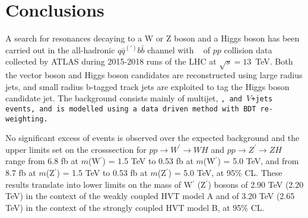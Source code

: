 \chapter{Conclusions}
\label{ch:conclusions}

A search for resonances decaying to a W or Z boson and a Higgs boson has been carried out in the all-hadronic $q\bar{q}^{(\prime)}b\bar{b}$ channel with \lumi~ of $pp$ collision data collected by ATLAS during 2015-2018 runs of the LHC at $\sqrt{s} = 13$~TeV.
Both the vector boson and Higgs boson candidates are reconstructed using large radius jets, and small radius b-tagged track jets are exploited to tag the Higgs boson candidate jet.
The background consists mainly of multijet, \tt, and $V$+jets events, and is modelled using a data driven method with BDT re-weighting.

No significant excess of events is observed over the expected background and the upper limits set on the crosssection for $pp \rightarrow W^\prime \rightarrow WH$ and $pp \rightarrow Z^\prime \rightarrow ZH$ range from 6.8 fb at $m$(W$^\prime$) = 1.5 TeV to 0.53 fb at $m$(W$^\prime$) = 5.0 TeV, and from 8.7 fb at $m$(Z$^\prime$) = 1.5 TeV to 0.53 fb at $m$(Z$^\prime$) = 5.0 TeV, at 95\% CL. These results translate into lower limits on the mass of W$^\prime$ (Z$^\prime$) bosons of 2.90 TeV (2.20 TeV) in the context of the weakly coupled HVT model A and of 3.20 TeV (2.65 TeV) in the context of the strongly coupled HVT model B, at 95\% CL.